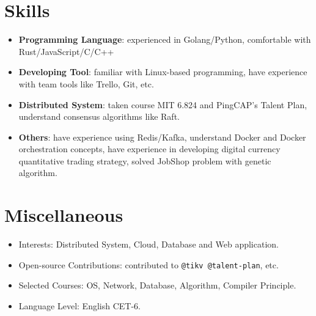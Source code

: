 \documentclass{resume}
\newcommand{\en}[1]{#1}
\newcommand{\zh}[1]{}
\begin{document}
\section{\en{Skills}\zh{技能}}
\begin{itemize}[parsep=0.25ex]
      \item \en{\textbf{Programming Language}:
                  experienced in Golang/Python, 
                  comfortable with Rust/JavaScript/C/C++}
            \zh{\textbf{编程语言}:
                  熟悉 Golang/Python，
                  了解 Rust/JavaScript/C/C++ 等}

      \item \en{\textbf{Developing Tool}:
                  familiar with Linux-based programming,
                  have experience with team tools like Trello, Git, etc.}
            \zh{\textbf{开发工具}:
                  熟悉 Linux，有 Trello、Git 等团队合作工具的使用经验}

      \item \en{\textbf{Distributed System}:
                  taken course MIT 6.824 and PingCAP's Talent Plan,
                  understand consensus algorithms like Raft.}
            \zh{\textbf{分布式系统}:
                  自主学习了 MIT 6.824 和 PingCAP's Talent Plan 课程，
                  了解 Raft 算法}

      \item \en{\textbf{Others}:
                  have experience using Redis/Kafka, 
                  understand Docker and Docker orchestration concepts, 
                  have experience in developing digital currency quantitative trading strategy, 
                  solved JobShop problem with genetic algorithm.}
            \zh{\textbf{其它}:
                  有 Redis/Kafka 使用经验，了解容器及容器编排相关概念，
                  开发过数字货币量化交易策略，使用遗传算法解决过 JobShop 问题}
\end{itemize}

\section{\en{Miscellaneous}\zh{杂项}}
\begin{itemize}[parsep=0.25ex]
      \item \en{Interests: Distributed System, Cloud, Database and Web application.}
            \zh{兴趣：分布式系统、云、数据库、Web 应用等}
      \item \en{Open-source Contributions: contributed to \texttt{@tikv @talent-plan}, etc.}
            \zh{开源贡献: 为 \texttt{@tikv @talent-plan} 等项目组织贡献过代码}
      \item \en{Selected Courses: OS, Network, Database, Algorithm, Compiler Principle.}
            \zh{主修课程：操作系统、计算机网络、数据库系统原理、算法设计与分析、编译原理}
      \item \en{Language Level: English CET-6.}
            \zh{语言水平：英语 CET-6}
\end{itemize}
\end{document}
